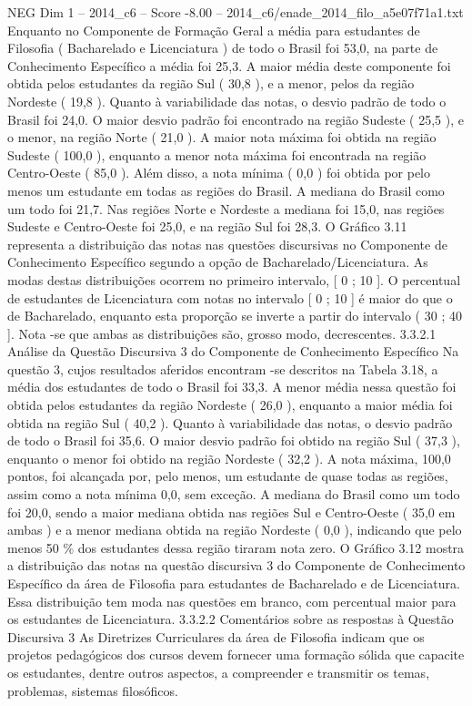 \begin{textsample}{NEG Dim 1 – 2014\_c6 – Score -8.00 – 2014\_c6/enade\_2014\_filo\_a5e07f71a1.txt}
Enquanto no Componente de Formação Geral a média para estudantes de Filosofia ( Bacharelado e Licenciatura ) de todo o Brasil foi 53,0, na parte de Conhecimento Específico a média foi 25,3.
A maior média deste componente foi obtida pelos estudantes da região Sul ( 30,8 ), e a menor, pelos da região Nordeste ( 19,8 ).
Quanto à variabilidade das notas, o desvio padrão de todo o Brasil foi 24,0.
O maior desvio padrão foi encontrado na região Sudeste ( 25,5 ), e o menor, na região Norte ( 21,0 ).
A maior nota máxima foi obtida na região Sudeste ( 100,0 ), enquanto a menor nota máxima foi encontrada na região Centro-Oeste ( 85,0 ).
Além disso, a nota mínima ( 0,0 ) foi obtida por pelo menos um estudante em todas as regiões do Brasil.
A mediana do Brasil como um todo foi 21,7.
Nas regiões Norte e Nordeste a mediana foi 15,0, nas regiões Sudeste e Centro-Oeste foi 25,0, e na região Sul foi 28,3.
O Gráfico 3.11 representa a distribuição das notas nas questões discursivas no Componente de Conhecimento Específico segundo a opção de Bacharelado/Licenciatura.
As modas destas distribuições ocorrem no primeiro intervalo, [ 0 ; 10 ].
O percentual de estudantes de Licenciatura com notas no intervalo [ 0 ; 10 ] é maior do que o de Bacharelado, enquanto esta proporção se inverte a partir do intervalo ( 30 ; 40 ].
Nota -se que ambas as distribuições são, grosso modo, decrescentes. 3.3.2.1 Análise da Questão Discursiva 3 do Componente de Conhecimento Específico Na questão 3, cujos resultados aferidos encontram -se descritos na Tabela 3.18, a média dos estudantes de todo o Brasil foi 33,3.
A menor média nessa questão foi obtida pelos estudantes da região Nordeste ( 26,0 ), enquanto a maior média foi obtida na região Sul ( 40,2 ).
Quanto à variabilidade das notas, o desvio padrão de todo o Brasil foi 35,6.
O maior desvio padrão foi obtido na região Sul ( 37,3 ), enquanto o menor foi obtido na região Nordeste ( 32,2 ).
A nota máxima, 100,0 pontos, foi alcançada por, pelo menos, um estudante de quase todas as regiões, assim como a nota mínima 0,0, sem exceção.
A mediana do Brasil como um todo foi 20,0, sendo a maior mediana obtida nas regiões Sul e Centro-Oeste ( 35,0 em ambas ) e a menor mediana obtida na região Nordeste ( 0,0 ), indicando que pelo menos 50 \% dos estudantes dessa região tiraram nota zero.
O Gráfico 3.12 mostra a distribuição das notas na questão discursiva 3 do Componente de Conhecimento Específico da área de Filosofia para estudantes de Bacharelado e de Licenciatura.
Essa distribuição tem moda nas questões em branco, com percentual maior para os estudantes de Licenciatura. 3.3.2.2 Comentários sobre as respostas à Questão Discursiva 3 As Diretrizes Curriculares da área de Filosofia indicam que os projetos pedagógicos dos cursos devem fornecer uma formação sólida que capacite os estudantes, dentre outros aspectos, a compreender e transmitir os temas, problemas, sistemas filosóficos.

\end{textsample}

